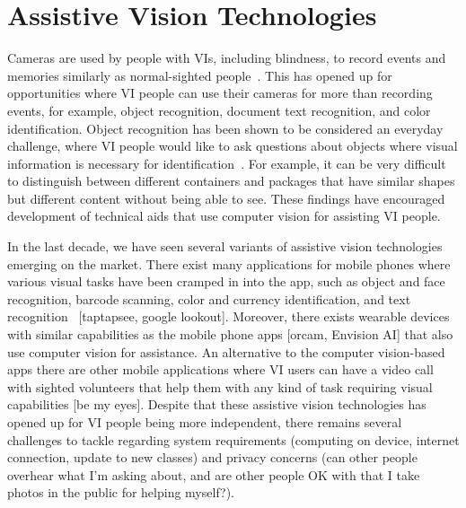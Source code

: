 


\section{Assistive Vision Technologies}\label{sec:assistive_vision} %

Cameras are used by people with VIs, including blindness, to record events and memories similarly as normal-sighted people~\cite{jayant2011supporting}. This has opened up for opportunities where VI people can use their cameras for more than recording events, for example, object recognition, document text recognition, and color identification. Object recognition has been shown to be considered an everyday challenge, where VI people would like to ask questions about objects where visual information is necessary for identification~\cite{brady2013visual}. For example, it can be very difficult to distinguish between different containers and packages that have similar shapes but different content without being able to see. These findings have encouraged development of technical aids that use computer vision for assisting VI people. 

In the last decade, we have seen several variants of assistive vision technologies emerging on the market. There exist many applications for mobile phones where various visual tasks have been cramped in into the app, such as object and face recognition, barcode scanning, color and currency identification, and text recognition~\cite{microsoft2017seeing} [taptapsee, google lookout]. Moreover, there exists wearable devices with similar capabilities as the mobile phone apps [orcam, Envision AI] that also use computer vision for assistance. An alternative to the computer vision-based apps there are other mobile applications where VI users can have a video call with sighted volunteers that help them with any kind of task requiring visual capabilities [be my eyes]. Despite that these assistive vision technologies has opened up for VI people being more independent, there remains several challenges to tackle regarding system requirements (computing on device, internet connection, update to new classes) and privacy concerns (can other people overhear what I'm asking about, and are other people OK with that I take photos in the public for helping myself?).  

